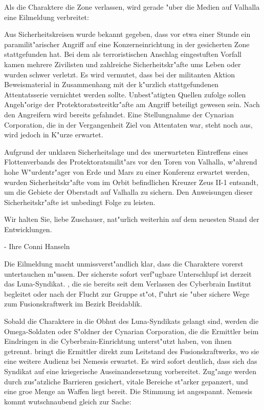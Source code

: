 
Als die Charaktere die Zone verlassen, wird gerade "uber die Medien auf Valhalla eine Eilmeldung verbreitet:

\begin{speech}
Aus Sicherheitskreisen wurde bekannt gegeben, dass vor etwa einer Stunde ein paramilit"arischer Angriff auf eine Konzerneinrichtung in der gesicherten Zone stattgefunden hat. Bei dem als terroristischen Anschlag eingestuften Vorfall kamen mehrere Zivilisten und zahlreiche Sicherheitskr"afte ums Leben oder wurden schwer verletzt. Es wird vermutet, dass bei der militanten Aktion Beweismaterial in Zusammenhang mit der k"urzlich stattgefundenen Attentatsserie vernichtet werden sollte. Unbest"atigten Quellen zufolge sollen Angeh"orige der Protektoratsstreitkr"afte am Angriff beteiligt gewesen sein. Nach den Angreifern wird bereits gefahndet. Eine Stellungnahme der Cynarian Corporation, die in der Vergangenheit Ziel von Attentaten war, steht noch aus, wird jedoch in K"urze erwartet.

\nopagebreak
Aufgrund der unklaren Sicherheitslage und des unerwarteten Eintreffens eines Flottenverbands des Protektoratsmilit"ars vor den Toren von Valhalla, w"ahrend hohe W"urdentr"ager von Erde und Mars zu einer Konferenz erwartet werden, wurden Sicherheitskr"afte vom im Orbit befindlichen Kreuzer Zeus II-1 entsandt, um die Gebiete der Oberstadt auf Valhalla zu sichern. Den Anweisungen dieser Sicherheitskr"afte ist unbedingt Folge zu leisten.

\nopagebreak
Wir halten Sie, liebe Zuschauer, nat"urlich weiterhin auf dem neuesten Stand der Entwicklungen.

\nopagebreak
- Ihre Conni Hanseln
\end{speech}

Die Eilmeldung macht unmissverst"andlich klar, dass die Charaktere vorerst untertauchen m"ussen. Der sicherste sofort verf"ugbare Unterschlupf ist derzeit das Luna-Syndikat. \xl{}, die sie bereits seit dem Verlassen des Cyberbrain Institut begleitet oder nach der Flucht zur Gruppe st"o\3t, f"uhrt sie "uber sichere Wege zum Fusionskraftwerk im Bezirk Breidablik.

Sobald die Charaktere in die Obhut des Luna-Syndikats gelangt sind, werden die Omega-Soldaten oder S"oldner der Cynarian Corporation, die die Ermittler beim Eindringen in die Cyberbrain-Einrichtung unterst"utzt haben, von ihnen getrennt. \xl{} bringt die Ermittler direkt zum Leitstand des Fusionskraftwerks, wo sie eine weitere Audienz bei Nemesis erwartet. Es wird sofort deutlich, dass sich das Syndikat auf eine kriegerische Auseinandersetzung vorbereitet. Zug"ange werden durch zus"atzliche Barrieren gesichert, vitale Bereiche st"arker gepanzert, und eine gro\3e Menge an Waffen liegt bereit. Die Stimmung ist angespannt. Nemesis kommt wutschnaubend gleich zur Sache:

